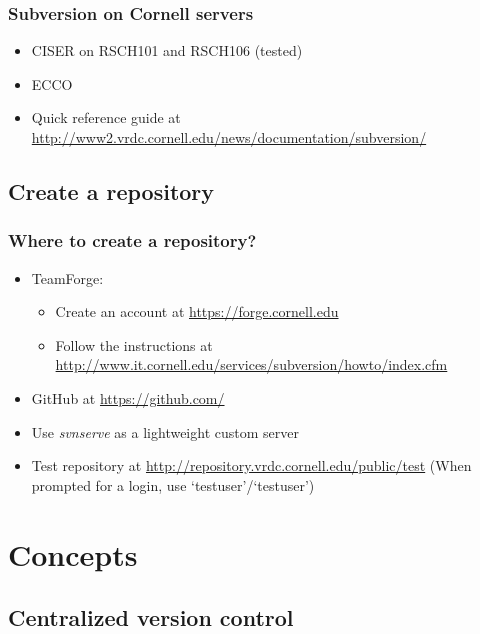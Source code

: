 \documentclass{beamer}
\begin{document}
\frame
{
  \frametitle{Subversion on Cornell servers}
  
  \begin{itemize}
  \item<1-> CISER on RSCH101 and RSCH106 (tested)
  \item<2-> ECCO
  \item<3-> Quick reference guide at \url{http://www2.vrdc.cornell.edu/news/documentation/subversion/}
  \end{itemize}

}

\subsection{Create a repository}

{
  \frametitle{Where to create a repository?}
  
  \begin{itemize}
  \item<1-> TeamForge:
  	\begin{itemize}
	\item<1-> Create an account at \url{https://forge.cornell.edu}
	\item<1-> Follow the instructions at \url{http://www.it.cornell.edu/services/subversion/howto/index.cfm}
	\end{itemize}
  \item<2-> GitHub at \url{https://github.com/}
  \item<3-> Use \textit{svnserve} as a lightweight custom server
  \item<4-> Test repository at \url{http://repository.vrdc.cornell.edu/public/test} (When prompted for a login, use `testuser'/`testuser')
  \end{itemize}

}


\section{Concepts}

\subsection{Centralized version control}
\end{document}

